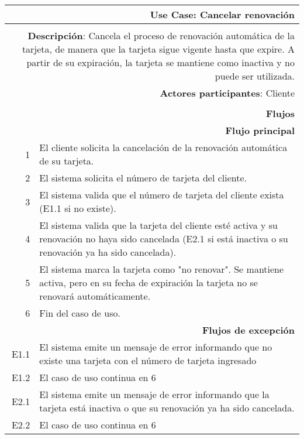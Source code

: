 \begin{tabularx}{\textwidth}{| r | X |}
\hline
\multicolumn{2}{|X|}{
\textbf{Use Case}: Cancelar renovación} \\

\hline
\multicolumn{2}{|c|}{\cellcolor[gray]{0.6}} \\

\hline
\multicolumn{2}{|X|}{
\textbf{Descripción}: Cancela el proceso de renovación automática de la tarjeta,
de manera que la tarjeta sigue vigente hasta que expire. A partir de su
expiración, la tarjeta se mantiene como inactiva y no puede ser utilizada.} \\

\hline
\multicolumn{2}{|X|}{
\textbf{Actores participantes}: Cliente} \\

\hline
\multicolumn{2}{|c|}{\cellcolor[gray]{0.6} } \\

\hline
\multicolumn{2}{|X|}{
\textbf{Flujos}} \\

\hline
\multicolumn{2}{|X|}{
\textbf{Flujo principal}} \\

\hline
1 & El cliente solicita la cancelación de la renovación automática de su
tarjeta. \\
\hline
2 & El sistema solicita el número de tarjeta del cliente. \\
\hline
3 & El sistema valida que el número de tarjeta del cliente exista (E1.1 si no
existe). \\
\hline
4 & El sistema valida que la tarjeta del cliente esté activa y su renovación no
haya sido cancelada (E2.1 si está inactiva o su renovación ya ha sido
cancelada). \\
\hline
5 & El sistema marca la tarjeta como "no renovar". Se mantiene activa, pero en
su fecha de expiración la tarjeta no se renovará automáticamente. \\
\hline
6 & Fin del caso de uso. \\

\hline
\multicolumn{2}{|X|}{
\textbf{Flujos de excepción}} \\

\hline
E1.1 & El sistema emite un mensaje de error informando que no existe una tarjeta
con el número de tarjeta ingresado \\
\hline
E1.2 & El caso de uso continua en 6 \\

\hline
E2.1 & El sistema emite un mensaje de error informando que la tarjeta está
inactiva o que su renovación ya ha sido cancelada. \\
\hline
E2.2 & El caso de uso continua en 6 \\

\hline
\end{tabularx}

